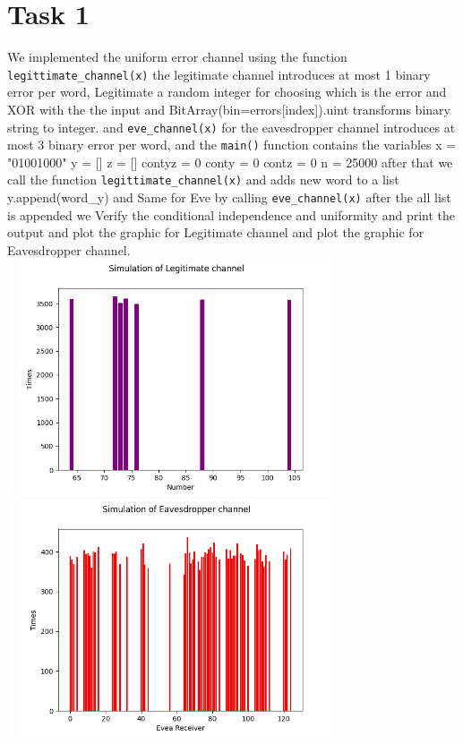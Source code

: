 \documentclass{report}
\begin{document}
 \section*{Task 1}
We implemented the uniform error channel using the function {\tt legittimate\_channel(x)} the legitimate channel introduces at most 1 binary error per word,
 Legitimate a random integer for choosing which is the error and XOR with the the input and {BitArray(bin=errors[index]).uint} transforms binary string to integer. and {\tt eve\_channel(x)} for the eavesdropper channel introduces at most 3 binary error per word, and the {\tt main()} function contains the variables  x = "01001000"
  y = []
  z = []
  contyz = 0
  conty = 0
  contz = 0
  n = 25000 after that we call the function  {\tt legittimate\_channel(x)} and adds new word to a list y.append(word\_y) and Same for Eve by  calling {\tt eve\_channel(x)} after the all list is appended we Verify the conditional independence and uniformity and print the output and plot the graphic for Legitimate channel and plot the graphic for Eavesdropper channel. \includegraphics[width=10cm,height=7cm]{Figure_1} \linebreak
 \includegraphics[width=10cm,height=7cm]{Figure_2}
\end{document}

